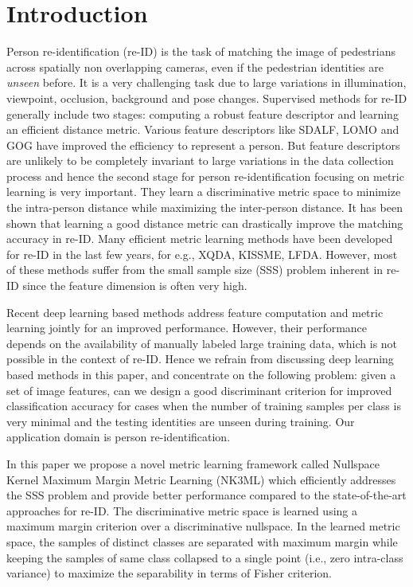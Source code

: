 \documentclass[runningheads]{llncs}
\begin{document}
\section{Introduction}
Person re-identification (re-ID) is the task of matching the image of pedestrians across spatially \color{black}non overlapping cameras, even if the pedestrian identities  are \textit{unseen} before. It is a very challenging task due to large variations in illumination, viewpoint, occlusion, background and pose changes. Supervised methods for re-ID generally include two stages: computing a robust feature descriptor and learning an efficient distance metric. Various feature descriptors like SDALF\cite{SDALF}, LOMO\cite{LOMO} and GOG\cite{GOG} have improved the efficiency to represent a person. But feature descriptors are unlikely to be completely invariant to large variations in the data collection process and hence the second stage for person re-identification focusing on metric learning is very important. They learn a discriminative metric space to minimize the intra-person distance while maximizing the inter-person distance. It has been shown that learning a good distance metric can drastically improve the matching accuracy in re-ID. Many efficient metric learning methods have been developed for re-ID in the last few years, for e.g., XQDA\cite{LOMO}, KISSME\cite{KISSME},  LFDA\cite{LFDA:CVPR}. However, most of these methods suffer from the small sample size (SSS) problem inherent in re-ID since the feature dimension is often very high. 


Recent deep learning based methods address feature computation and metric learning jointly for an improved performance. However, their performance depends on the availability of manually labeled large training data, which is not possible in the context of re-ID. Hence we refrain from discussing deep learning based methods in this paper, and concentrate on the following problem: given a set of image features, can we design a good discriminant criterion for improved classification accuracy for cases when the number of training samples per class is very minimal and the testing identities are unseen during training. \color{black}Our application domain is person re-identification.

In this paper we propose a  novel metric learning framework called Nullspace Kernel Maximum Margin Metric Learning (NK3ML) which efficiently addresses the SSS problem and provide better performance compared to the state-of-the-art approaches for re-ID. The discriminative metric space is learned using a maximum margin criterion over a discriminative nullspace. In the learned metric space, the samples of distinct classes are separated with maximum margin while keeping the samples of same class collapsed to a single point (i.e., zero intra-class variance) to maximize the separability in terms of Fisher criterion.
\end{document}
